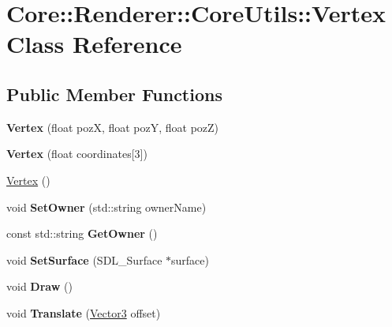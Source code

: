 \hypertarget{class_core_1_1_renderer_1_1_core_utils_1_1_vertex}{\section{Core\+:\+:Renderer\+:\+:Core\+Utils\+:\+:Vertex Class Reference}
\label{class_core_1_1_renderer_1_1_core_utils_1_1_vertex}
}
\subsection*{Public Member Functions}
\begin{DoxyCompactItemize}
\item 
\hypertarget{class_core_1_1_renderer_1_1_core_utils_1_1_vertex_ac4a1203fd62f56b9e150af734c02f63d}{{\bfseries Vertex} (float poz\+X, float poz\+Y, float poz\+Z)}\label{class_core_1_1_renderer_1_1_core_utils_1_1_vertex_ac4a1203fd62f56b9e150af734c02f63d}

\item 
\hypertarget{class_core_1_1_renderer_1_1_core_utils_1_1_vertex_a7425ca8e99a59edc28dc1167c937c301}{{\bfseries Vertex} (float coordinates\mbox{[}3\mbox{]})}\label{class_core_1_1_renderer_1_1_core_utils_1_1_vertex_a7425ca8e99a59edc28dc1167c937c301}

\item 
\hyperlink{class_core_1_1_renderer_1_1_core_utils_1_1_vertex_ac8ac66bade652d222a0030d2fcd5fcdb}{Vertex} ()
\item 
\hypertarget{class_core_1_1_renderer_1_1_core_utils_1_1_vertex_aa4d1d7034cc9c6f8fae7304cd2da6497}{void {\bfseries Set\+Owner} (std\+::string owner\+Name)}\label{class_core_1_1_renderer_1_1_core_utils_1_1_vertex_aa4d1d7034cc9c6f8fae7304cd2da6497}

\item 
\hypertarget{class_core_1_1_renderer_1_1_core_utils_1_1_vertex_a262cd977224bc003fca332df0c0c914b}{const std\+::string {\bfseries Get\+Owner} ()}\label{class_core_1_1_renderer_1_1_core_utils_1_1_vertex_a262cd977224bc003fca332df0c0c914b}

\item 
\hypertarget{class_core_1_1_renderer_1_1_core_utils_1_1_vertex_a27ac49a58494b33944c19c272e89c830}{void {\bfseries Set\+Surface} (S\+D\+L\+\_\+\+Surface $\ast$surface)}\label{class_core_1_1_renderer_1_1_core_utils_1_1_vertex_a27ac49a58494b33944c19c272e89c830}

\item 
\hypertarget{class_core_1_1_renderer_1_1_core_utils_1_1_vertex_a48ff2cabec9274b57909dc4d4b4b8815}{void {\bfseries Draw} ()}\label{class_core_1_1_renderer_1_1_core_utils_1_1_vertex_a48ff2cabec9274b57909dc4d4b4b8815}

\item 
\hypertarget{class_core_1_1_renderer_1_1_core_utils_1_1_vertex_aac3582457e0006c4f076f0af64a7a54a}{void {\bfseries Translate} (\hyperlink{class_vector3}{Vector3} offset)}\label{class_core_1_1_renderer_1_1_core_utils_1_1_vertex_aac3582457e0006c4f076f0af64a7a54a}

\end{DoxyCompactItemize}

